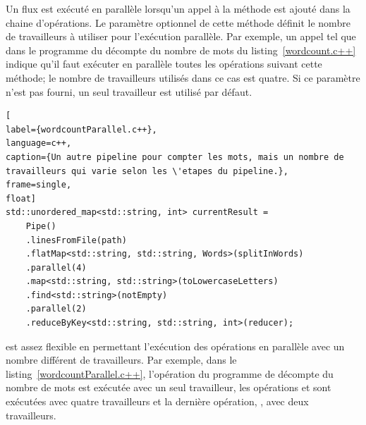 Un flux est ex\'ecut\'e en parall\`ele lorsqu'un appel \`a la m\'ethode  est ajout\'e dans la chaine d'op\'erations. Le param\`etre optionnel de cette m\'ethode d\'efinit le nombre de travailleurs \`a utiliser pour l'ex\'ecution parall\`ele. Par exemple, un appel tel que  dans le programme du d\'ecompte du nombre de mots du listing~\ref{wordcount.c++} indique qu'il faut ex\'ecuter en parall\`ele toutes les op\'erations suivant cette m\'ethode;  le nombre de travailleurs utilis\'es dans ce cas est quatre. Si ce param\`etre n'est pas fourni,  un seul travailleur est utilis\'e par d\'efaut. 


\begin{lstlisting}[
label={wordcountParallel.c++},
language=c++,
caption={Un autre pipeline pour compter les mots, mais un nombre de travailleurs qui varie selon les \'etapes du pipeline.},
frame=single,
float]
std::unordered_map<std::string, int> currentResult = 
	Pipe()
	.linesFromFile(path) 
	.flatMap<std::string, std::string, Words>(splitInWords)
	.parallel(4)
	.map<std::string, std::string>(toLowercaseLetters)
	.find<std::string>(notEmpty)
	.parallel(2)
	.reduceByKey<std::string, std::string, int>(reducer);
\end{lstlisting}




\PpFf{} est assez flexible en permettant l'ex\'ecution des op\'erations en parall\`ele avec un nombre diff\'erent de travailleurs. Par exemple, dans le listing~\ref{wordcountParallel.c++}, l’opération  du programme de d\'ecompte du nombre de mots est exécutée avec un seul travailleur, les opérations  et  sont exécutées avec quatre travailleurs et la dernière opération, , avec deux travailleurs. 






